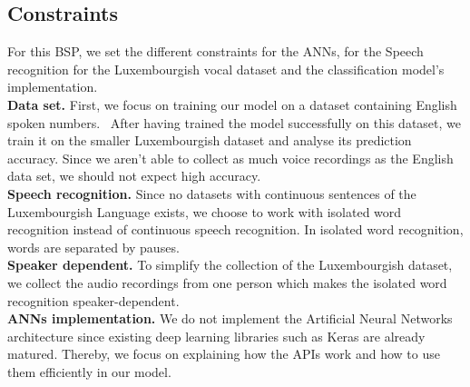 
\subsection{Constraints}

For this BSP, we set the different constraints for the ANNs, for the Speech
recognition for the Luxembourgish vocal dataset and the classification model's
implementation.\\

\textbf{Data set.} First, we focus on training our model on a dataset
containing English spoken numbers.~\cite{DBLP:journals/corr/abs-1804-03209}
After having trained the model successfully on this dataset, we train it on the
smaller Luxembourgish dataset and analyse its prediction accuracy. Since we
aren't able to collect as much voice recordings as the English data set, we
should not expect high accuracy.\\


\textbf{Speech recognition.} Since no datasets with continuous sentences of the
Luxembourgish Language exists, we choose to work with isolated word recognition
instead of continuous speech recognition. In isolated word recognition, words are
separated by pauses.\\

\textbf{Speaker dependent.} To simplify the collection of the Luxembourgish
dataset, we collect the audio recordings from one person which makes the
isolated word recognition speaker-dependent.\\

\textbf{ANNs implementation.} We do not implement the Artificial Neural Networks
architecture since existing deep learning libraries such as Keras are already
matured. Thereby, we focus on explaining how the APIs work and how to use them
efficiently in our model.
